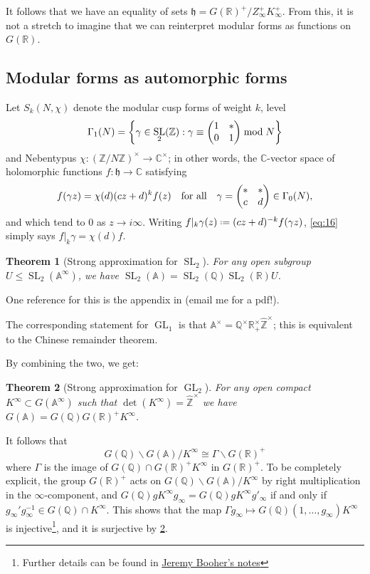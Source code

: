 \documentclass[11pt]{report}
\let\mbb\mathbb
\let\mf\mathfrak
\newcommand{\1}{\mathbbm 1}
\newcommand{\Z}{\mathbb{Z}}
\newcommand{\Q}{\mathbb{Q}}
\newcommand{\R}{\mathbb{R}}
\newcommand{\C}{\mathbb{C}}
\newcommand{\A}{\mbb A}
\newcommand*{\defeq}{\mathrel{\vcenter{\baselineskip0.5ex \lineskiplimit0pt
      \hbox{\scriptsize.}\hbox{\scriptsize.}}}%
  =}
\DeclareMathOperator{\SL}{SL}
\DeclareMathOperator{\GL}{GL}
\theoremstyle{plain}
\newtheorem{thm}{Theorem}[section]
\newcounter{ex}
\theoremstyle{definition}
\theoremstyle{remark}
\numberwithin{equation}{section}
\begin{document}
It follows that we have an equality of sets
$\mf h = G(\R)^{+}/Z_{\infty}^{+}K_{\infty}^{+}$. From this, it is not a stretch
to imagine that we can reinterpret modular forms as functions on
$G(\R)$.

\subsection{Modular forms as automorphic forms}
\label{sec:mfs-aut-fs}

Let $S_{k}(N,\chi)$ denote the modular cusp forms of weight $k$, level
\begin{equation}
  \label{eq:24}
\Gamma_{1}(N) = \qty{\gamma \in \SL_{2}(\Z) : \gamma \equiv  \mqty(1  & * \\ 0 & 1) \bmod{N} }
\end{equation}
and Nebentypus $\chi \colon (\Z/N\Z)^{\times} \to \C^{\times}$; in other words, the
$\C$-vector space of holomorphic functions $f \colon \mf h \to \C$
satisfying
\begin{equation}
  \label{eq:16}
f(\gamma z) = \chi(d)(cz+d)^{k}f(z) \qq{for all} \gamma = \mqty(*  & * \\ c & d) \in \Gamma_{0}(N),
\end{equation}
and which tend to $0$ as $z \to i\infty$. Writing
$f|_{k}\gamma (z) \defeq (cz+d)^{-k}f(\gamma z)$, \cref{eq:16} simply
says $f|_{k}\gamma = \chi(d) f$.


\begin{thm}[Strong approximation for $\SL_2$]
 For any open subgroup $U \le \SL_{2}(\A^{\infty})$, we have $\SL_{2}(\A) =
 \SL_{2}(\Q)\SL_{2}(\R)U$.
\end{thm}
One reference for this is the appendix in \cite{garrett1990} (email me
for a pdf!).

The corresponding statement for $\GL_{1}$ is that
$\A^{\times} = \Q^{\times} \R^{\times}_{+} \hat{\Z}^{\times}$; this is equivalent to the
Chinese remainder theorem.

By combining the two, we get:
\begin{thm}[Strong approximation for $\GL_{2}$]\label{thm:strong-approx-gl2}
  For any open compact $K^{\infty} \subset G(\A^{\infty})$ such that
  $\det(K^{\infty}) = \hat{\Z}^{\times}$ we have $G(\A) = G(\Q)G(\R)^{+}K^{\infty}$.
\end{thm}
It follows that
\begin{equation}
  \label{eq:28}
  G(\Q) \backslash G(\A) / K^{\infty} \cong \Gamma \backslash G(\R)^{+}
\end{equation}
where $\Gamma$ is the image of $G(\Q) \cap G(\R)^{+}K^{\infty}$ in
$G(\R)^{+}$. To be completely explicit, the group $G(\R)^{+}$ acts on
$G(\Q) \backslash G(\A) / K^{\infty}$ by right multiplication in the
$\infty$-component, and
$G(\Q) gK^{\infty}g_{\infty} = G(\Q)gK^{\infty} g'_{\infty}$ if and only if
$g_{\infty}'g_{\infty}^{-1} \in G(\Q) \cap K^{\infty}$. This shows that the map
$\Gamma g_{\infty} \mapsto G(\Q)(1,\ldots,g_{\infty})K^{\infty}$ is injective\footnote{Further
  details can be found
  in
  \href{https://www.math.canterbury.ac.nz/~j.booher/expos/adelic_mod_forms.pdf}{Jeremy
    Booher's notes}}, and it is surjective by
\cref{thm:strong-approx-gl2}.
\end{document}
